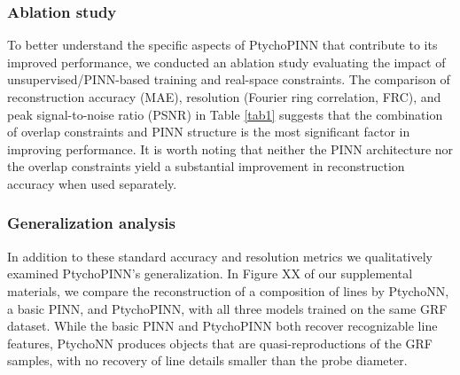 \documentclass[sn-mathphys]{sn-jnl}%
\theoremstyle{thmstyleone}%
\theoremstyle{thmstyletwo}%
\theoremstyle{thmstylethree}%
\begin{document}
\subsubsection{Ablation study}

To better understand the specific aspects of PtychoPINN that contribute to its improved performance, we conducted an ablation study evaluating the impact of unsupervised/PINN-based training and real-space constraints. The comparison of reconstruction accuracy (MAE), resolution (Fourier ring correlation, FRC), and peak signal-to-noise ratio (PSNR) in Table \ref{tab1} suggests that the combination of overlap constraints and PINN structure is the most significant factor in improving performance. It is worth noting that neither the PINN architecture nor the overlap constraints yield a substantial improvement in reconstruction accuracy when used separately.

\subsubsection{Generalization analysis}
In addition to these standard accuracy and resolution metrics we qualitatively examined PtychoPINN's generalization. In Figure XX of our supplemental materials, we compare the reconstruction of a composition of lines by PtychoNN, a basic PINN, and PtychoPINN, with all three models trained on the same GRF dataset. While the basic PINN and PtychoPINN both recover recognizable line features, PtychoNN produces objects that are quasi-reproductions of the GRF samples, with no recovery of line details smaller than the probe diameter. 

\end{document}
